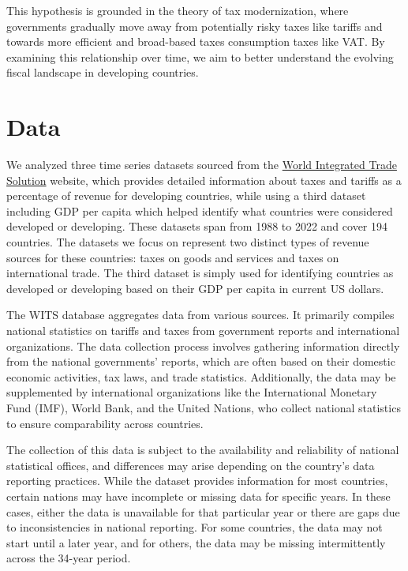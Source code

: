 \documentclass[12pt]{article}
\begin{document}
This hypothesis is grounded in the theory of tax modernization, where governments gradually move away from potentially risky taxes like tariffs and towards more efficient and broad-based taxes consumption taxes like VAT. By examining this relationship over time, we aim to better understand the evolving fiscal landscape in developing countries.

\section{Data}
\label{sec:data}

We analyzed three time series datasets sourced from the \href{https://wits.worldbank.org/CountryProfile/en/Country/BY-COUNTRY/StartYear/1988/EndYear/2022/Indicator/GC-TAX-GSRV-VA-ZS}{World Integrated Trade Solution} website, which provides detailed information about taxes and tariffs as a percentage of revenue for developing countries, while using a third dataset including GDP per capita which helped identify what countries were considered developed or developing. These datasets span from 1988 to 2022 and cover 194 countries. The datasets we focus on represent two distinct types of revenue sources for these countries: taxes on goods and services and taxes on international trade. The third dataset is simply used for identifying countries as developed or developing based on their GDP per capita in current US dollars. 

The WITS database aggregates data from various sources. It primarily compiles national statistics on tariffs and taxes from government reports and international organizations. The data collection process involves gathering information directly from the national governments' reports, which are often based on their domestic economic activities, tax laws, and trade statistics. Additionally, the data may be supplemented by international organizations like the International Monetary Fund (IMF), World Bank, and the United Nations, who collect national statistics to ensure comparability across countries.

The collection of this data is subject to the availability and reliability of national statistical offices, and differences may arise depending on the country’s data reporting practices. While the dataset provides information for most countries, certain nations may have incomplete or missing data for specific years. In these cases, either the data is unavailable for that particular year or there are gaps due to inconsistencies in national reporting. For some countries, the data may not start until a later year, and for others, the data may be missing intermittently across the 34-year period.
\end{document}

